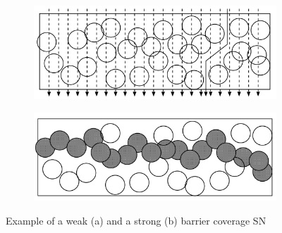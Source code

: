 \begin{figure}
\begin{subfigure}{.5\textwidth}
  \centering
  \includegraphics[width=.8\linewidth]{images/weak-coverage.png}
  \caption{}
  \label{fig:weak}
\end{subfigure}%
\begin{subfigure}{.5\textwidth}
  \centering
  \includegraphics[width=.8\linewidth]{images/strong-coverage.png}
  \caption{}
  \label{fig:strong}
\end{subfigure}
\caption{Example of a weak (a) and a strong (b) barrier coverage \ac{SN}}
\label{fig:coverage}
\end{figure}

\FloatBarrier


